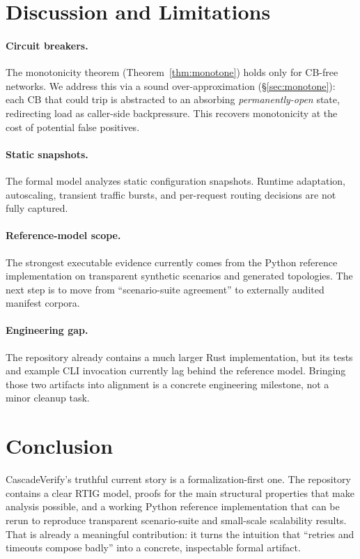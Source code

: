 \documentclass[10pt,twocolumn]{article}
\begin{document}
\section{Discussion and Limitations}
\label{sec:discussion}

\paragraph{Circuit breakers.}
The monotonicity theorem (Theorem~\ref{thm:monotone}) holds only for CB-free
networks. We address this via a sound over-approximation
(\S\ref{sec:monotone}): each CB that could trip is abstracted to an absorbing
\emph{permanently-open} state, redirecting load as caller-side backpressure.
This recovers monotonicity at the cost of potential false positives.

\paragraph{Static snapshots.}
The formal model analyzes static configuration snapshots.  Runtime adaptation,
autoscaling, transient traffic bursts, and per-request routing decisions are not
fully captured.

\paragraph{Reference-model scope.}
The strongest executable evidence currently comes from the Python reference
implementation on transparent synthetic scenarios and generated topologies.  The
next step is to move from ``scenario-suite agreement'' to externally audited
manifest corpora.

\paragraph{Engineering gap.}
The repository already contains a much larger Rust implementation, but its tests
and example CLI invocation currently lag behind the reference model.  Bringing
those two artifacts into alignment is a concrete engineering milestone, not a
minor cleanup task.

\section{Conclusion}

CascadeVerify's truthful current story is a formalization-first one.  The
repository contains a clear RTIG model, proofs for the main structural
properties that make analysis possible, and a working Python reference
implementation that can be rerun to reproduce transparent scenario-suite and
small-scale scalability results.  That is already a meaningful contribution: it
turns the intuition that ``retries and timeouts compose badly'' into a concrete,
inspectable formal artifact.
\end{document}
